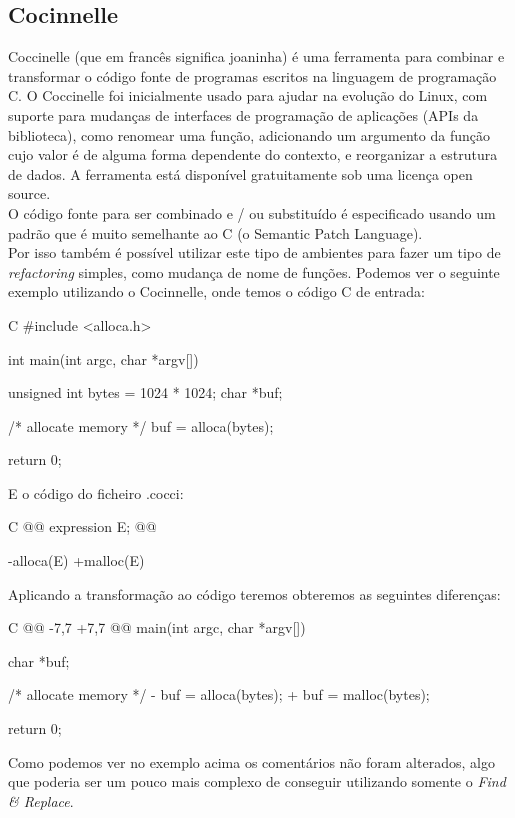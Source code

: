 \documentclass[runningheads,a4paper]{llncs}
\begin{document}
\begin{multicols}{2}
\subsection{Cocinnelle}
Coccinelle (que em francês significa joaninha) é uma ferramenta para combinar e transformar o código fonte de programas escritos na linguagem de programação C. O Coccinelle foi inicialmente usado para ajudar na evolução do Linux, com suporte para mudanças de interfaces de programação de aplicações (APIs da biblioteca), como renomear uma função, adicionando um argumento da função cujo valor é de alguma forma dependente do contexto, e reorganizar a estrutura de dados. A ferramenta está disponível gratuitamente sob uma licença open source.\\
O código fonte para ser combinado e / ou substituído é especificado usando um padrão que é muito semelhante ao C (o Semantic Patch Language).\\
Por isso também é possível utilizar este tipo de ambientes para fazer um tipo de \emph{refactoring} simples, como mudança de nome de funções. Podemos ver o seguinte exemplo utilizando o Cocinnelle, onde temos o código C de entrada:\\

\begin{myCode}{C}
#include <alloca.h>

    int
    main(int argc, char *argv[]) {
            unsigned int bytes = 1024 * 1024;
            char *buf;

            /* allocate memory */
            buf = alloca(bytes);

            return 0;
    }
\end{myCode}
E o código do ficheiro .cocci:\\
\begin{myCode}{C}
@@ expression E; @@

    -alloca(E)
    +malloc(E)
\end{myCode}

Aplicando a transformação ao código teremos obteremos as seguintes diferenças:
\begin{myCode}{C}
@@ -7,7 +7,7 @@ main(int argc, char *argv[]){
             char *buf;
 
             /* allocate memory */
    -        buf = alloca(bytes);
    +        buf = malloc(bytes);
 
             return 0;
     }
\end{myCode}
Como podemos ver no exemplo acima os comentários não foram alterados, algo que poderia ser um pouco mais complexo de conseguir utilizando somente o \emph{Find \& Replace}.

\end{multicols}
\end{document}
